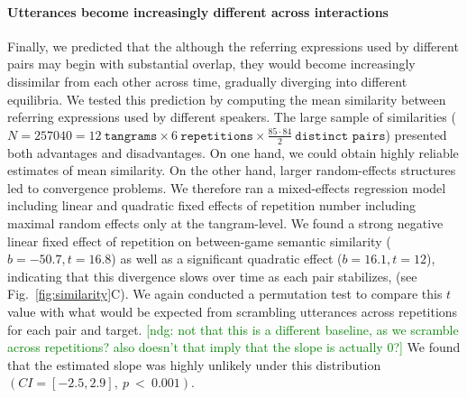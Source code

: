 \documentclass[alpha-refs]{wiley-article}
\newcommand{\ndg}[1]{\textcolor{green}{[ndg: #1]}}
\begin{document}
\paragraph{Utterances become increasingly different across interactions}

Finally, we predicted that the although the referring expressions used by different pairs may begin with substantial overlap, they would become increasingly dissimilar from each other across time, gradually diverging into different equilibria.
We tested this prediction by computing the mean similarity between referring expressions used by different speakers.
The large sample of similarities ($N = 257040 = 12~\texttt{tangrams} \times 6~\texttt{repetitions} \times \frac{85 \cdot 84}{2}~\texttt{distinct pairs}$) presented both advantages and disadvantages.
On one hand, we could obtain highly reliable estimates of mean similarity. 
On the other hand, larger random-effects structures led to convergence problems.
We therefore ran a mixed-effects regression model including linear and quadratic fixed effects of repetition number including maximal random effects only at the tangram-level. 
We found a strong negative linear fixed effect of repetition on between-game semantic similarity ($b = -50.7, t= 16.8$) as well as a significant quadratic effect ($b= 16.1, t = 12$), indicating that this divergence slows over time as each pair stabilizes, (see Fig.~\ref{fig:similarity}C).
We again conducted a permutation test to compare this $t$ value with what would be expected from scrambling utterances across repetitions for each pair and target.
\ndg{not that this is a different baseline, as we scramble across repetitions? also doesn't that imply that the slope is actually 0?}
We found that the estimated slope was highly unlikely under this distribution $(CI = [-2.5, 2.9],~p~<~0.001)$. 


\end{document}
